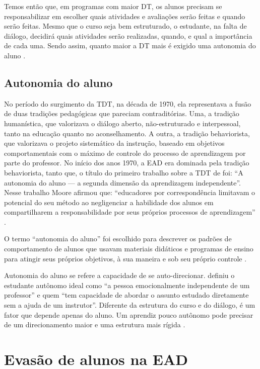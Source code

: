 Temos então que, em programas com maior DT, os alunos precisam se
responsabilizar em escolher quais atividades e avaliações serão feitas e quando
serão feitas. Mesmo que o curso seja bem estruturado, o estudante, na falta de
diálogo, decidirá quais atividades serão realizadas, quando, e qual a
importância de cada uma. Sendo assim, quanto maior a DT mais é exigido uma
autonomia do aluno \citeauthor{moore1973transational}.

\subsection{Autonomia do aluno}

No período do surgimento da TDT, na década de 1970, ela representava a fusão de
duas tradições pedagógicas que pareciam contraditórias. Uma, a tradição
humanística, que valorizava o diálogo aberto, não-estruturado e interpessoal,
tanto na educação quanto no aconselhamento. A outra, a tradição behaviorista,
que valorizava o projeto sistemático da instrução, baseado em objetivos
comportamentais com o máximo de controle do processo de aprendizagem por parte
do professor. No início dos anos 1970, a EAD era dominada pela tradição
behaviorista, tanto que, o título do primeiro trabalho sobre a TDT de
 foi: ``A autonomia do aluno --- a segunda dimensão
da aprendizagem independente''. Nesse trabalho Moore afirmou que: ``educadores
por correspondência limitavam o potencial do seu método ao negligenciar a
habilidade dos alunos em compartilharem a responsabilidade por seus próprios
processos de aprendizagem'' \citeauthor{moore1973transational}.

O termo ``autonomia do aluno'' foi escolhido para descrever os padrões de
comportamento de alunos que usavam materiais didáticos e programas de ensino
para atingir seus próprios objetivos, à sua maneira e sob seu próprio controle
\citeauthor{moore1973transational}.

Autonomia do aluno  se refere a capacidade de se auto-direcionar.
 definiu o estudante autônomo ideal como
``a pessoa emocionalmente independente de um professor'' e quem ``tem capacidade
de abordar o assunto estudado diretamente sem a ajuda de um instrutor''.
Diferente da estrutura do curso e do diálogo, é um fator que depende apenas do
aluno. Um aprendiz pouco autônomo pode precisar de um direcionamento maior e uma
estrutura mais rígida \cite{huang2016understanding}.

\section{Evasão de alunos na EAD}

